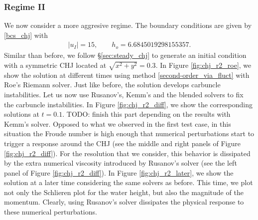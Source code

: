 \documentclass[preprint, 11pt]{article}
\newcommand{\bfu}{{u}}
\begin{document}
\subsubsection{Regime II}
We now consider a more aggresive regime. The boundary conditions are given by \eqref{bcs_chj} with 
\begin{align}\label{bcs_chj_r2}
  |\bfu_I|=15, \qquad h_o=6.6845019298155357.
\end{align}
Similar than before, we follow \S \ref{sec:steady_chj} to generate an initial condition with a symmetric CHJ located at
$\sqrt{x^2+y^2}=0.3$. In Figure \ref{fig:chj_r2_roe}, we show the solution at different times using method
\eqref{second-order_via_fluct} with Roe's Riemann solver. Just like before, the solution develops
carbuncle instabilities. Let us now use Rusanov's, Kemm's and the blended solvers to fix the
carbuncle instabilities. In Figure \ref{fig:chj_r2_diff}, we show the corresponding solutions at $t=0.1$.
{\color{red} TODO: finish this part depending on the results with Kemm's solver.}
%
Opposed to what we observed in the first test case, in this situation the Froude number is
high enough that numerical perturbations start to trigger a response around the CHJ
(see the middle and right panels of Figure \ref{fig:chj_r2_diff}).
For the resolution that we consider, this behavior is dissipated by the extra numerical viscosity introduced by
Rusanov's solver (see the left panel of Figure \ref{fig:chj_r2_diff}).
In Figure \ref{fig:chj_r2_later}, we show the solution at a later time considering the same solvers as before.
This time, we plot not only the Schlieren plot for the water height, but also the magnitude of the momentum. 
Clearly, using Rusanov's solver dissipates the physical response to these numerical perturbations. 
\end{document}
